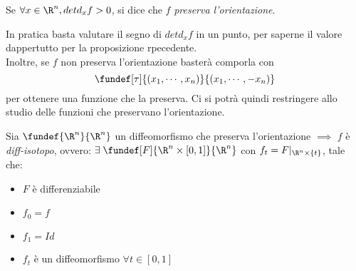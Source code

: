 \begin{defn}
Se $\forall x \in \R^n, det d_xf > 0$, si dice che $f$ \emph{preserva l'orientazione}.
\end{defn}

\begin{oss}
In pratica basta valutare il segno di $det d_xf$ in un punto, per saperne il valore dappertutto per la proposizione rpecedente.\\
Inoltre, se $f$ non preserva l'orientazione basterà comporla con
\begin{equation*}
\fundef[\tau]{(x_1,\cdots,x_n)}{(x_1,\cdots,-x_n)}
\end{equation*}
per ottenere una funzione che la preserva. Ci si potrà quindi restringere allo studio delle funzioni che preservano l'orientazione.
\end{oss}

\begin{teo}
Sia $\fundef{\R^n}{\R^n}$ un diffeomorfismo che preserva l'orientazione $\implies$ $f$ è \emph{diff-isotopo}, ovvero:
$\exists \; \fundef[F]{\R^n \times [0,1]}{\R^n}$ con $f_t = F|_{\R^n \times \{t\}}$, tale che:
\begin{itemize}
\item $F$ è differenziabile
\item $f_0=f$
\item $f_1 = Id$
\item $f_t$ è un diffeomorfismo $\forall t \in [0,1]$
\end{itemize}
\end{teo}

